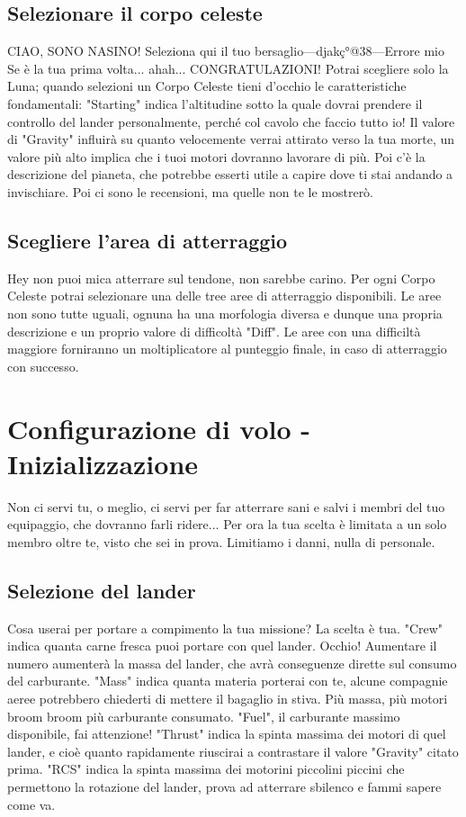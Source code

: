\documentclass[9pt, twoside]{article}
\begin{document}
\subsection{Selezionare il corpo celeste}
CIAO, SONO NASINO!
Seleziona qui il tuo bersaglio---djakç°@38---Errore mio
Se è la tua prima volta... ahah... CONGRATULAZIONI!
Potrai scegliere solo la Luna; quando selezioni un Corpo Celeste tieni d'occhio le caratteristiche fondamentali:
"Starting" indica l'altitudine sotto la quale dovrai prendere il controllo del lander personalmente, perché col cavolo che faccio tutto io!
Il valore di "Gravity" influirà su quanto velocemente verrai attirato verso la tua morte, un valore più alto implica che i tuoi motori dovranno lavorare di più.
Poi c'è la descrizione del pianeta, che potrebbe esserti utile a capire dove ti stai andando a invischiare.
Poi ci sono le recensioni, ma quelle non te le mostrerò.

\subsection{Scegliere l'area di atterraggio}
Hey non puoi mica atterrare sul tendone, non sarebbe carino.
Per ogni Corpo Celeste potrai selezionare una delle tree aree di atterraggio disponibili.
Le aree non sono tutte uguali, ognuna ha una morfologia diversa e dunque una propria descrizione e un proprio valore di difficoltà "Diff".
Le aree con una difficiltà maggiore forniranno un moltiplicatore al punteggio finale, in caso di atterraggio con successo.
\newpage

\section{Configurazione di volo - Inizializzazione}
Non ci servi tu, o meglio, ci servi per far atterrare sani e salvi i membri del tuo equipaggio, che dovranno farli ridere...
Per ora la tua scelta è limitata a un solo membro oltre te, visto che sei in prova. Limitiamo i danni, nulla di personale.

\subsection{Selezione del lander}
Cosa userai per portare a compimento la tua missione? La scelta è tua.
"Crew" indica quanta carne fresca puoi portare con quel lander. Occhio! Aumentare il numero aumenterà la massa del lander, che avrà conseguenze dirette sul consumo del carburante.
"Mass" indica quanta materia porterai con te, alcune compagnie aeree potrebbero chiederti di mettere il bagaglio in stiva. Più massa, più motori broom broom più carburante consumato.
"Fuel", il carburante massimo disponibile, fai attenzione!
"Thrust" indica la spinta massima dei motori di quel lander, e cioè quanto rapidamente riuscirai a contrastare il valore "Gravity" citato prima.
"RCS" indica la spinta massima dei motorini piccolini piccini che permettono la rotazione del lander, prova ad atterrare sbilenco e fammi sapere come va.
\end{document}
